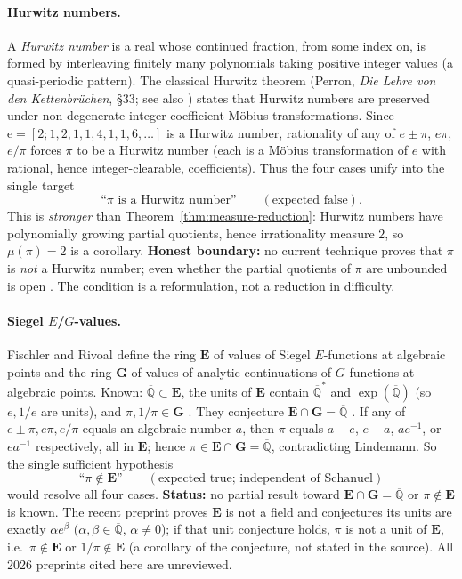 \documentclass[11pt]{amsart}
\theoremstyle{definition}
\theoremstyle{remark}
\numberwithin{equation}{section}
\newcommand{\Q}{\mathbb{Q}}
\newcommand{\irr}{\mu}
\newcommand{\ee}{\mathrm{e}}
\begin{document}
\paragraph{Hurwitz numbers.} A \emph{Hurwitz number} is a real whose continued fraction, from some index on, is formed by interleaving finitely many polynomials taking positive integer values (a quasi-periodic pattern). The classical Hurwitz theorem (Perron, \emph{Die Lehre von den Kettenbr\"uchen}, \S33; see also \cite{Hetyei2014}) states that Hurwitz numbers are preserved under non-degenerate integer-coefficient M\"obius transformations. Since $\ee=[2;1,2,1,1,4,1,1,6,\dots]$ is a Hurwitz number, rationality of any of $e\pm\pi$, $e\pi$, $e/\pi$ forces $\pi$ to be a Hurwitz number (each is a M\"obius transformation of $e$ with rational, hence integer-clearable, coefficients). Thus the four cases unify into the single target
\[
\text{``$\pi$ is a Hurwitz number''}\qquad(\text{expected false}).
\]
This is \emph{stronger} than Theorem~\ref{thm:measure-reduction}: Hurwitz numbers have polynomially growing partial quotients, hence irrationality measure $2$, so $\irr(\pi)=2$ is a corollary. \textbf{Honest boundary:} no current technique proves that $\pi$ is \emph{not} a Hurwitz number; even whether the partial quotients of $\pi$ are unbounded is open \cite{Hildebrand2024}. The condition is a reformulation, not a reduction in difficulty.

\paragraph{Siegel \texorpdfstring{$E$}{E}/$G$-values.} Fischler and Rivoal \cite{FischlerRivoal2016} define the ring $\mathbf{E}$ of values of Siegel $E$-functions at algebraic points and the ring $\mathbf{G}$ of values of analytic continuations of $G$-functions at algebraic points. Known: $\overline{\Q}\subset\mathbf{E}$, the units of $\mathbf{E}$ contain $\overline{\Q}^*$ and $\exp(\overline{\Q})$ (so $e,1/e$ are units), and $\pi,1/\pi\in\mathbf{G}$ \cite{FischlerRivoal2014}. They conjecture $\mathbf{E}\cap\mathbf{G}=\overline{\Q}$ \cite{FischlerRivoal2024}. If any of $e\pm\pi,e\pi,e/\pi$ equals an algebraic number $a$, then $\pi$ equals $a-e$, $e-a$, $ae^{-1}$, or $ea^{-1}$ respectively, all in $\mathbf{E}$; hence $\pi\in\mathbf{E}\cap\mathbf{G}=\overline{\Q}$, contradicting Lindemann. So the single sufficient hypothesis
\[
\text{``$\pi\notin\mathbf{E}$''}\qquad(\text{expected true; independent of Schanuel})
\]
would resolve all four cases. \textbf{Status:} no partial result toward $\mathbf{E}\cap\mathbf{G}=\overline{\Q}$ or $\pi\notin\mathbf{E}$ is known. The recent preprint \cite{FischlerRivoal2026} proves $\mathbf{E}$ is not a field and conjectures its units are exactly $\alpha e^\beta$ ($\alpha,\beta\in\overline{\Q}$, $\alpha\ne0$); if that unit conjecture holds, $\pi$ is not a unit of $\mathbf{E}$, i.e.\ $\pi\notin\mathbf{E}$ or $1/\pi\notin\mathbf{E}$ (a corollary of the conjecture, not stated in the source). All 2026 preprints cited here are unreviewed.
\end{document}
